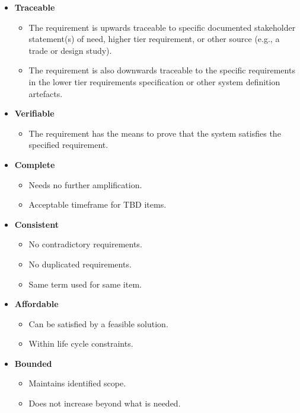 \documentclass[10pt]{article}
\begin{document}
\begin{multicols}{5}
\begin{block}
\begin{itemize}
\begin{itemize}
  \end{itemize}
  \item \textbf{Traceable}
  \begin{itemize}
    \item The requirement is upwards traceable to specific documented stakeholder statement(s) of need, higher tier requirement, or other source (e.g., a trade or design study).
    \item The requirement is also downwards traceable to the specific requirements in the lower tier requirements specification or other system definition artefacts.
  \end{itemize}
  \item \textbf{Verifiable}
  \begin{itemize}
    \item The requirement has the means to prove that the system satisfies the specified requirement.
  \end{itemize}
\end{itemize}
\end{block}

\begin{block}
\begin{itemize}
  \item \textbf{Complete}
  \begin{itemize}
    \item Needs no further amplification.
    \item Acceptable timeframe for TBD items.
  \end{itemize}
  \item \textbf{Consistent}
  \begin{itemize}
    \item No contradictory requirements.
    \item No duplicated requirements.
    \item Same term used for same item.
  \end{itemize}
  \item \textbf{Affordable}
  \begin{itemize}
    \item Can be satisfied by a feasible solution.
    \item Within life cycle constraints.
  \end{itemize}
  \item \textbf{Bounded}
  \begin{itemize}
    \item Maintains identified scope.
    \item Does not increase beyond what is needed.
  \end{itemize}
\end{itemize}
\end{block}


\end{multicols}
\end{document}
